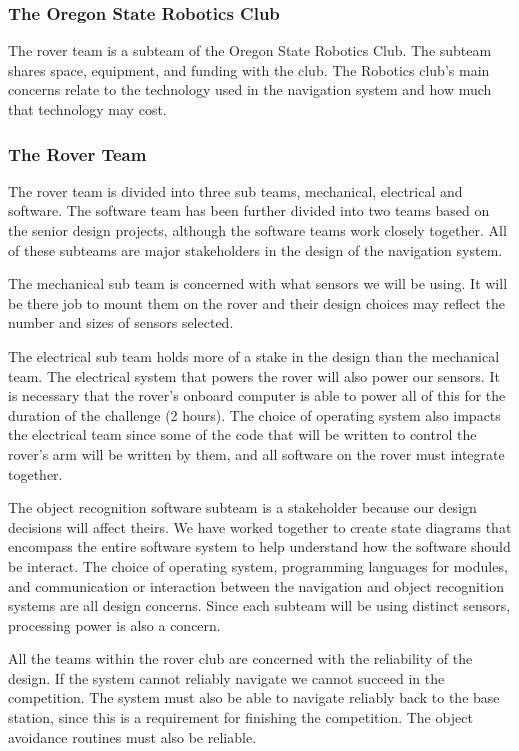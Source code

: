 \documentclass[10pt, oneside,onecolumn]{IEEEtran}
\begin{document}
\subsubsection{The Oregon State Robotics Club}

The rover team is a subteam of the Oregon State Robotics Club. The subteam shares space, equipment, and funding with the club. The Robotics club's main concerns relate to the technology used in the navigation system and how much that technology may cost. 

\subsubsection{The Rover Team}

The rover team is divided into three sub teams, mechanical, electrical and software. The software team has been further divided into two teams based on the senior design projects, although the software teams work closely together. All of these subteams are major stakeholders in the design of the navigation system. 

The mechanical sub team is concerned with what sensors we will be using. It will be there job to mount them on the rover and their design choices may reflect the number and sizes of sensors selected. 

The electrical sub team holds more of a stake in the design than the mechanical team. The electrical system that powers the rover will also power our sensors. It is necessary that the rover's onboard computer is able to power all of this for the duration of the challenge (2 hours). The choice of operating system also impacts the electrical team since some of the code that will be written to control the rover's arm will be written by them, and all software on the rover must integrate together. 

The object recognition software subteam is a stakeholder because our design decisions will affect theirs. We have worked together to create state diagrams that encompass the entire software system to help understand how the software should be interact. The choice of operating system, programming languages for modules, and communication or interaction between the navigation and object recognition systems are all design concerns. Since each subteam will be using distinct sensors, processing power is also a concern. 

All the teams within the rover club are concerned with the reliability of the design. If the system cannot reliably navigate we cannot succeed in the competition. The system must also be able to navigate reliably back to the base station, since this is a requirement for finishing the competition. The object avoidance routines must also be reliable.
\end{document}
